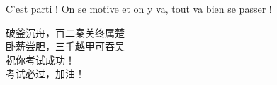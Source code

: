 \documentclass[11pt,a4paper]{article}
\theoremstyle{definition}%
\newtheorem{Q}{Question}[] %
\begin{document}
{\color{white}C'est parti ! On se motive et on y va, tout va bien se passer !}

\begin{center}
\begin{CJK}{UTF8}{gbsn}
破釜沉舟，百二秦关终属楚\\
卧薪尝胆，三千越甲可吞吴\\
祝你考试成功！\\
考试必过，加油！
\end{CJK}

\end{center}




\end{document}
